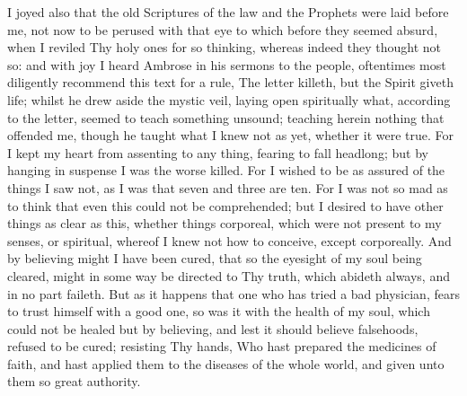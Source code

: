 \documentclass[b5paper,openright,12pt,twoside]{book}
\begin{document}
I joyed also that the old Scriptures of the law and the Prophets were
laid before me, not now to be perused with that eye to which before they
seemed absurd, when I reviled Thy holy ones for so thinking, whereas
indeed they thought not so: and with joy I heard Ambrose in his sermons
to the people, oftentimes most diligently recommend this text for a
rule, The letter killeth, but the Spirit giveth life; whilst he drew
aside the mystic veil, laying open spiritually what, according to the
letter, seemed to teach something unsound; teaching herein nothing that
offended me, though he taught what I knew not as yet, whether it were
true. For I kept my heart from assenting to any thing, fearing to fall
headlong; but by hanging in suspense I was the worse killed. For I
wished to be as assured of the things I saw not, as I was that seven and
three are ten. For I was not so mad as to think that even this could not
be comprehended; but I desired to have other things as clear as this,
whether things corporeal, which were not present to my senses, or
spiritual, whereof I knew not how to conceive, except corporeally. And
by believing might I have been cured, that so the eyesight of my soul
being cleared, might in some way be directed to Thy truth, which abideth
always, and in no part faileth. But as it happens that one who has tried
a bad physician, fears to trust himself with a good one, so was it with
the health of my soul, which could not be healed but by believing, and
lest it should believe falsehoods, refused to be cured; resisting Thy
hands, Who hast prepared the medicines of faith, and hast applied
them to the diseases of the whole world, and given unto them so great
authority.
\end{document}
